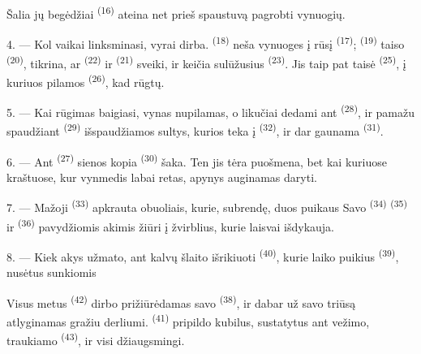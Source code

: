 Šalia jų begėdžiai  \textsuperscript{(16)} ateina net prieš
spaustuvą pagrobti vynuogių.

4. --- Kol vaikai linksminasi, vyrai dirba. 
\textsuperscript{(18)} neša vynuoges į rūsį 
\textsuperscript{(17)};  \textsuperscript{(19)} taiso
 \textsuperscript{(20)}, tikrina, ar 
\textsuperscript{(22)} ir  \textsuperscript{(21)} sveiki, ir keičia
sulūžusius  \textsuperscript{(23)}. Jis taip pat taisė
 \textsuperscript{(25)}, į kuriuos pilamos 
\textsuperscript{(26)}, kad rūgtų.

5. --- Kai rūgimas baigiasi, vynas nupilamas, o likučiai dedami ant
 \textsuperscript{(28)}, ir pamažu spaudžiant 
\textsuperscript{(29)} išspaudžiamos sultys, kurios teka į 
\textsuperscript{(32)}, ir dar gaunama  \textsuperscript{(31)}.

\VUsaut{6.0mm}
\VUsaut{3.4mm}

6. --- Ant  \textsuperscript{(27)} sienos kopia 
\textsuperscript{(30)} šaka. Ten jis tėra puošmena, bet kai kuriuose kraštuose, kur
vynmedis labai retas, apynys auginamas  daryti.

7. --- Mažoji  \textsuperscript{(33)} apkrauta obuoliais, kurie,
subrendę, duos puikaus  Savo 
\textsuperscript{(34)}  \textsuperscript{(35)} ir 
\textsuperscript{(36)} pavydžiomis akimis žiūri į žvirblius, kurie laisvai
išdykauja.

8. --- Kiek akys užmato, ant kalvų šlaito išrikiuoti 
\textsuperscript{(40)}, kurie laiko puikius  \textsuperscript{(39)},
nusėtus sunkiomis 

Visus metus  \textsuperscript{(42)} dirbo prižiūrėdamas savo
 \textsuperscript{(38)}, ir dabar už savo triūsą atlyginamas gražiu
derliumi.  \textsuperscript{(41)} pripildo kubilus,
sustatytus ant vežimo, traukiamo  \textsuperscript{(43)}, ir visi
džiaugsmingi.

\VUsaut{5.0mm}
\VUsaut{3.4mm}

